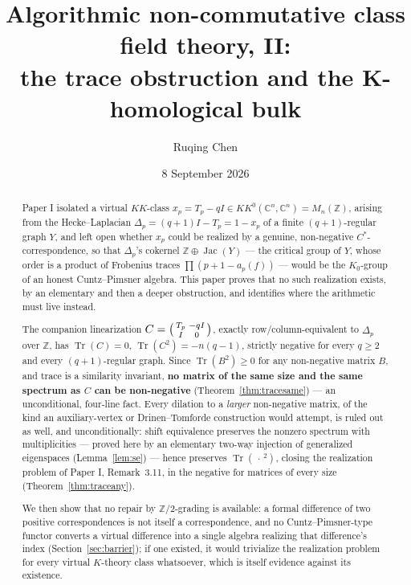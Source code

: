 \documentclass[11pt]{amsart}
\title[Algorithmic non-commutative class field theory, II]
{Algorithmic non-commutative class field theory, II:\\
the trace obstruction and the K-homological bulk}
\author{Ruqing Chen}
\date{8 September 2026}
\numberwithin{equation}{section}
\theoremstyle{definition}
\theoremstyle{remark}
\newcommand{\Z}{\mathbb{Z}}
\newcommand{\C}{\mathbb{C}}
\newcommand{\Tr}{\operatorname{Tr}}
\newcommand{\Jac}{\operatorname{Jac}}
\begin{document}
\begin{abstract}
Paper I isolated a virtual $KK$-class $x_p=T_p-qI\in KK^0(\C^n,\C^n)=M_n(\Z)$, arising
from the Hecke--Laplacian $\Delta_p=(q+1)I-T_p=1-x_p$ of a finite $(q+1)$-regular graph
$Y$, and left open whether $x_p$ could be realized by a genuine, non-negative
$C^*$-correspondence, so that $\Delta_p$'s cokernel $\Z\oplus\Jac(Y)$ --- the critical
group of $Y$, whose order is a product of Frobenius traces $\prod(p+1-a_p(f))$ ---
would be the $K_0$-group of an honest Cuntz--Pimsner algebra. This paper proves that no
such realization exists, by an elementary and then a deeper obstruction, and identifies
where the arithmetic must live instead.

The companion linearization $C=\begin{psmallmatrix}T_p&-qI\\I&0\end{psmallmatrix}$,
exactly row/column-equivalent to $\Delta_p$ over $\Z$, has
$\Tr(C)=0$, $\Tr(C^2)=-n(q-1)$, strictly negative for every $q\ge2$ and every
$(q+1)$-regular graph. Since $\Tr(B^2)\ge0$ for any non-negative matrix $B$, and trace is
a similarity invariant, \textbf{no matrix of the same size and the same spectrum as $C$
can be non-negative} (Theorem~\ref{thm:tracesame}) --- an unconditional, four-line fact.
Every dilation to a \emph{larger} non-negative matrix, of the kind an
auxiliary-vertex or Drinen--Tomforde construction would attempt, is ruled out as well,
and unconditionally: shift equivalence preserves the nonzero spectrum with
multiplicities --- proved here by an elementary two-way injection of generalized
eigenspaces (Lemma~\ref{lem:se}) --- hence preserves $\Tr(\,\cdot\,^2)$, closing the
realization problem of Paper I, Remark~3.11, in the negative for matrices of every size
(Theorem~\ref{thm:traceany}).

We then show that no repair by $\Z/2$-grading is available: a formal difference of two
positive correspondences is not itself a correspondence, and no Cuntz--Pimsner-type
functor converts a virtual difference into a single algebra realizing that difference's
index (Section~\ref{sec:barrier}); if one existed, it would trivialize the realization
problem for every virtual $K$-theory class whatsoever, which is itself evidence against
its existence.


\end{abstract}
\end{document}
